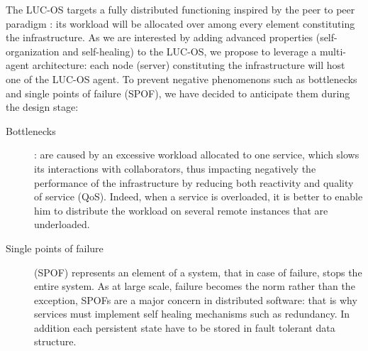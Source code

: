 The LUC-OS targets a fully distributed functioning inspired by the peer to peer
paradigm : its workload will be allocated over among every element constituting
the infrastructure. As we are interested by adding advanced properties 
(self-organization and self-healing) to the LUC-OS, we propose to leverage a 
multi-agent architecture: each node (server) constituting the infrastructure 
will host one of the LUC-OS agent. To prevent negative phenomenons such as
bottlenecks and single points of failure (SPOF), we have decided to anticipate
them during the design stage:

\begin{description}

  \item [Bottlenecks] : are caused by an excessive workload allocated to one 
  service, which slows its interactions with collaborators, thus impacting
  negatively the performance of the infrastructure by reducing both reactivity 
  and quality of service (QoS). Indeed, when a service is overloaded, it is 
  better to enable him to distribute the workload on several remote instances 
  that are underloaded.

  \item [Single points of failure] (SPOF) represents an element of a system, 
  that in case of failure, stops the entire system. As at large scale, failure 
  becomes the norm rather than the exception, SPOFs are a major concern in
  distributed software: that is why services must implement self healing 
  mechanisms such as redundancy. In addition each persistent state have to be 
  stored in fault tolerant data structure.

\end{description}


